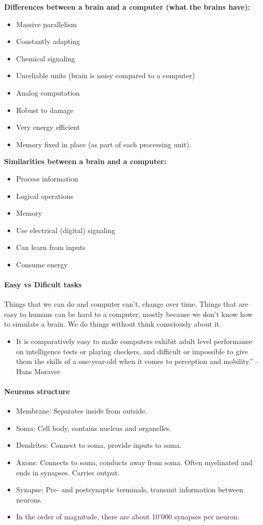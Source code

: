 \documentclass[main]{subfiles}
\begin{document}
\textbf{Differences between a brain and a computer (what the brains have):}
\begin{itemize}[noitemsep,nolistsep]
	\item Massive parallelism
	\item Constantly adapting
	\item Chemical signaling
	\item Unreliable units (brain is noisy compared to a computer)
	\item Analog computation
	\item Robust to damage
	\item Very energy efficient
	\item Memory fixed in place (as part of each processing unit).
\end{itemize}
\textbf{Similarities between a brain and a computer:}
\begin{itemize}[noitemsep,nolistsep]
	\item Process information
	\item Logical operations
	\item Memory
	\item Use electrical (digital) signaling
	\item Can learn from inputs
	\item Consume energy
\end{itemize}

\paragraph{Easy vs Dificult tasks}
Things that we can do and computer can't, change over time. Things that are easy to humans can be hard to a computer, mostly because we don't know how to simulate a brain. We do things without think consciously about it.

\begin{itemize}
\item It is comparatively easy to make computers exhibit adult level performance on intelligence tests or playing checkers, and difficult or impossible to give them the skills of a one-year-old when it comes to perception and mobility.” – Hans Moravec
\end{itemize}

\paragraph{Neurons structure}
\begin{itemize}[noitemsep,nolistsep]
	\item Membrane: Separates inside from outside.
	\item Soma: Cell body, contains nucleus and organelles.
	\item Dendrites: Connect to soma, provide inputs to soma.
	\item Axons: Connects to soma, conducts away from soma. Often myelinated and ends in synapses. Carries output.
	\item Synapse: Pre- and postsynaptic terminals, transmit information between neurons.
	\item In the order of magnitude, there are about 10'000 synapses per neuron.
\end{itemize}
\end{document}
